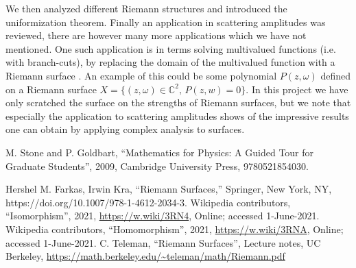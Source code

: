 \documentclass[lettersize,11pt]{article}
\begin{document}
We then analyzed different Riemann structures and introduced the uniformization theorem. Finally an application in scattering amplitudes was reviewed, there are however many more applications which we have not mentioned. One such application is in terms solving multivalued functions (i.e. with branch-cuts), by replacing the domain of the multivalued function with a Riemann surface \cite{Surf}. An example of this could be some polynomial $P(z,\omega)$ defined on a Riemann surface $X=\{(z,\omega)\in \mathds{C}^2,\,P(z,w)=0\}$. In this project we have only scratched the surface on the strengths of Riemann surfaces, but we note that especially the application to scattering amplitudes shows of the impressive results one can obtain by applying complex analysis to surfaces.
\begin{thebibliography}{99}
M. Stone and  P. Goldbart,
``Mathematics for Physics: A Guided Tour for Graduate Students'',
 2009,
Cambridge University Press, 
9780521854030.

Hershel M. Farkas, Irwin Kra, 
``Riemann Surfaces,'' 
Springer, New York, NY, 
https://doi.org/10.1007/978-1-4612-2034-3.
Wikipedia contributors,
``Isomorphism'', 2021, \url{https://w.wiki/3RN4}, Online; accessed 1-June-2021.
{}
Wikipedia contributors,
``Homomorphism'', 2021, \url{https://w.wiki/3RNA}, Online; accessed 1-June-2021.
{}
C. Teleman,
``Riemann Surfaces'',
Lecture notes, 
UC Berkeley,
\url{https://math.berkeley.edu/~teleman/math/Riemann.pdf}
\end{thebibliography}
\end{document}
